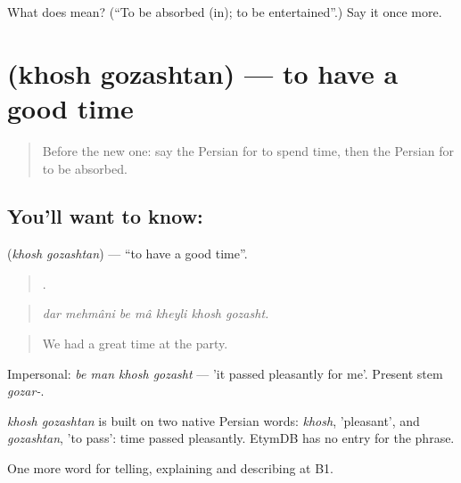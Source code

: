 \begin{tcolorbox}[breakable,colback=teal!4,colframe=teal!35!black,title={Before you move on}]
What does   mean? (\textquotedblleft{}To be absorbed (in); to be entertained\textquotedblright{}.) Say it once more.
\end{tcolorbox}
\section[\texorpdfstring{\fa{خوش} \fa{گذشتن} (khosh gozashtan)}{خوش گذشتن (khosh gozashtan)}]{  (khosh gozashtan) — to have a good time}

\label{lesson:FA-C510-khosh-gozashtan}



\begin{quote}
Before the new one: say the Persian for to spend time, then the Persian for to be absorbed.
\end{quote}

\subsection*{You'll want to know:  }
\textbf{ } (\emph{khosh gozashtan}) — \textquotedblleft{}to have a good time\textquotedblright{}.

\begin{quote}
      .
\end{quote}

\begin{quote}
\emph{dar mehmâni be mâ kheyli khosh gozasht.}
\end{quote}

\begin{quote}
We had a great time at the party.
\end{quote}

Impersonal: \emph{be man khosh gozasht} — 'it passed pleasantly for me'. Present stem \emph{gozar-}.

\begin{cousinweb}
\emph{khosh gozashtan} is built on two native Persian words: \emph{khosh}, 'pleasant', and \emph{gozashtan}, 'to pass': time passed pleasantly. EtymDB has no entry for the phrase.
\end{cousinweb}

\begin{grammarlens}[title={What you've built}]
One more word for telling, explaining and describing at B1.
\end{grammarlens}

